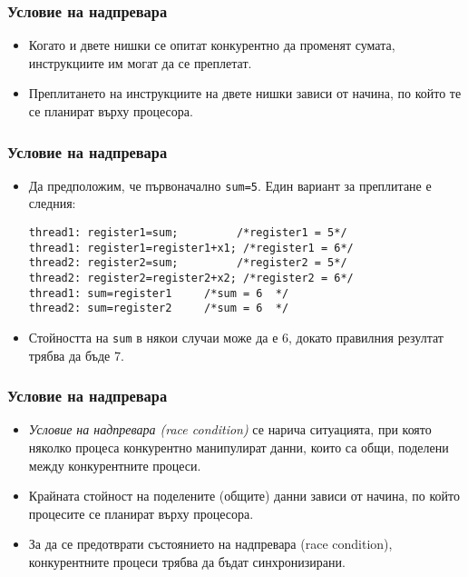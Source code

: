 \documentclass[ignorenonframetext, hyperref=unicode]{beamer}
\begin{document}
\begin{frame}[containsverbatim]
\frametitle{Условие на надпревара}
\begin{itemize}
  \item Когато и двете нишки се опитат конкурентно да променят
  сумата, инструкциите им могат да се преплетат.
  \item Преплитането на инструкциите на двете нишки зависи от
  начина, по който те се планират върху процесора.
\end{itemize}
\end{frame}

\begin{frame}[containsverbatim]
\frametitle{Условие на надпревара}
\begin{itemize}
  \item Да предположим, че първоначално \lstinline{sum=5}. Един вариант за
  преплитане е следния:
\begin{lstlisting}
thread1: register1=sum; 		/*register1 = 5*/
thread1: register1=register1+x1; /*register1 = 6*/
thread2: register2=sum;     	/*register2 = 5*/	
thread2: register2=register2+x2; /*register2 = 6*/	
thread1: sum=register1     /*sum = 6  */
thread2: sum=register2     /*sum = 6  */
\end{lstlisting}
  \item Стойността на \lstinline{sum} в някои случаи може да е 6, докато правилния
  резултат трябва да бъде 7.
\end{itemize}
\end{frame}

\begin{frame}[containsverbatim]
\frametitle{Условие на надпревара}
\begin{itemize}
  \item {\em Условие на надпревара (race condition)} се нарича ситуацията, при която
  няколко
  процеса конкурентно манипулират данни, които са общи, поделени между конкурентните
  процеси.
  \item Крайната стойност на поделените (общите) данни зависи от начина, по
  който процесите се планират върху процесора.
  \item За да се предотврати състоянието на надпревара (race condition),
  конкурентните процеси трябва да бъдат синхронизирани.
\end{itemize}
\end{frame}
\end{document}
